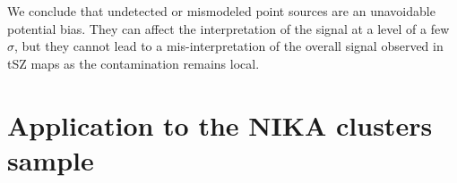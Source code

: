 \documentclass[twocolumn,traditabstract]{aa}
\begin{document}
We conclude that undetected or mismodeled point sources are an unavoidable potential bias. They can affect the interpretation of the signal at a level of a few $\sigma$, but they cannot lead to a mis-interpretation of the overall signal observed in tSZ maps as the contamination remains local.

\section{Application to the NIKA clusters sample}\label{sec:Application_to_the_NIKA_clusters_sample}
\end{document}
